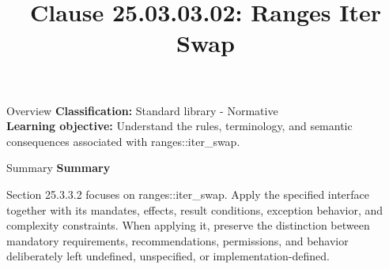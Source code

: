 \documentclass[10pt,letterpaper]{article}
\title{Clause 25.03.03.02: Ranges Iter Swap}
\author{}
\date{}
\begin{document}
\maketitle
\begin{CornellOverviewBox}{Overview}
\textbf{Classification:} Standard library - Normative\\[2pt]
\textbf{Learning objective:} Understand the rules, terminology, and semantic consequences associated with ranges::iter\_swap.
\end{CornellOverviewBox}\begin{CornellSummaryBox}{Summary}
{\sffamily\bfseries\color{Accent} Summary}\par\vspace{3pt}Section 25.3.3.2 focuses on ranges::iter\_swap. Apply the specified interface together with its mandates, effects, result conditions, exception behavior, and complexity constraints. When applying it, preserve the distinction between mandatory requirements, recommendations, permissions, and behavior deliberately left undefined, unspecified, or implementation-defined.
\end{CornellSummaryBox}
\end{document}
